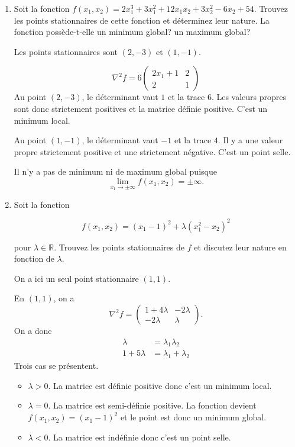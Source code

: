 \begin{enumerate}
  
  \item Soit la fonction $f(x_1, x_2)= 2 x_1^3+3 x_1^2+12x_1 x_2 + 3 x_2^2
    -6 x_2 + 54$. 
    Trouvez les points stationnaires de cette fonction et déterminez leur nature.
    La fonction possède-t-elle un minimum global? un maximum global?

    \begin{solution}
      Les points stationnaires sont $(2,-3)$ et $(1,-1)$.
      
      \[ \nabla^2 f = 6
        \begin{pmatrix}
          2x_1 + 1 & 2\\
          2 & 1
        \end{pmatrix} 
      \]
      Au point $(2,-3)$, le déterminant vaut $1$ et la trace $6$. 
      Les valeurs propres sont donc strictement positives
      et la matrice définie positive.
      C'est un minimum local.
      
      Au point $(1,-1)$, le déterminant vaut $-1$ et la trace $4$.
      Il y a une valeur propre strictement positive et une strictement négative.
      C'est un point selle.
      
      Il n'y a pas de minimum ni de maximum global puisque
      \[ \lim_{x_1 \rightarrow\pm\infty} f(x_1,x_2) = \pm\infty .\] 
    \end{solution}
    
  \item Soit la fonction
  
    \[f(x_1,x_2) = (x_1 - 1)^2 + \lambda(x_1^2 - x_2)^2\]

    pour $\lambda \in \mathbb{R}$. Trouvez les points stationnaires de $f$
    et discutez leur nature en fonction de $\lambda$.
    
    \begin{solution}
      On a ici un seul point stationnaire $(1,1)$.
      
      En $(1,1)$, on a
      \[ \nabla^2 f = 
        \begin{pmatrix}
          1+4\lambda & -2\lambda \\
          -2\lambda & \lambda
        \end{pmatrix}.
      \]
      On a donc 
      \begin{align*}
        \lambda &= \lambda_1 \lambda_2 \\
        1 + 5\lambda &= \lambda_1 + \lambda_2  
      \end{align*}
      Trois cas se présentent.
      \begin{itemize}
        \item $\lambda > 0$. La matrice est définie positive 
        donc c'est un minimum local.
        \item $\lambda = 0$. La matrice est semi-définie positive.
        La fonction devient $f(x_1,x_2) = (x_1 - 1)^2$ 
        et le point est donc un minimum global.
        \item $\lambda < 0$. La matrice est indéfinie
        donc c'est un point selle.
      \end{itemize}
    \end{solution}
    

\end{enumerate}
